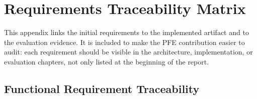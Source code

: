 \chapter{Requirements Traceability Matrix}
\label{app:traceability}

This appendix links the initial requirements to the implemented artifact and to
the evaluation evidence. It is included to make the PFE contribution easier to
audit: each requirement should be visible in the architecture, implementation,
or evaluation chapters, not only listed at the beginning of the report.

\section{Functional Requirement Traceability}

